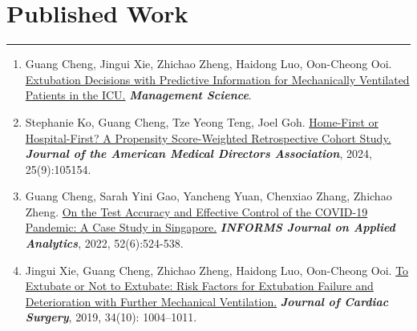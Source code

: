 \documentclass[12pt, a4paper]{article}
\begin{document}
{\begin{itemize}[leftmargin=16pt, itemsep=2pt]
\end{itemize}




\section*{Published Work}
\vspace*{4pt}
\hrule

\begin{enumerate}[leftmargin=30pt]

	\item Guang Cheng, Jingui Xie, Zhichao Zheng, Haidong Luo, Oon-Cheong Ooi.
	\href{https://doi.org/10.1287/mnsc.2021.01427}{Extubation Decisions with Predictive Information for Mechanically Ventilated Patients in the ICU.}
	\textit{\textbf{Management Science}}.
	
	\item Stephanie Ko, Guang Cheng, Tze Yeong Teng, Joel Goh.
	\href{https://doi.org/10.1016/j.jamda.2024.105154}{Home-First or Hospital-First? A Propensity Score-Weighted Retrospective Cohort Study.}
	\textit{\textbf{Journal of the American Medical Directors Association}}, 2024, 25(9):105154.
	
	\item Guang Cheng, Sarah Yini Gao, Yancheng Yuan, Chenxiao Zhang, Zhichao Zheng. 
	\href{https://doi.org/10.1287/inte.2022.1117}{On the Test Accuracy and Effective Control of the COVID-19 Pandemic: A Case Study in Singapore.} 
	\textit{\textbf{INFORMS Journal on Applied Analytics}}, 2022, 52(6):524-538.

	\item Jingui Xie, Guang Cheng, Zhichao Zheng, Haidong Luo, Oon-Cheong Ooi. 
	\href{https://doi.org/10.1111/jocs.14189}{To Extubate or Not to Extubate: Risk Factors for Extubation Failure and Deterioration with Further Mechanical Ventilation.}
	\textit{\textbf{Journal of Cardiac Surgery}}, 2019, 34(10): 1004–1011.

\end{enumerate}




}
\end{document}
